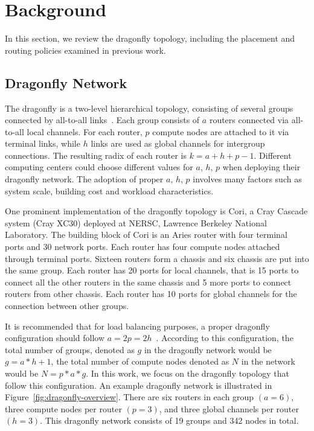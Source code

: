 
\section{Background}
\label{sec:background}

In this section, we review the dragonfly topology, including the placement and routing policies examined in previous work. 

\subsection{Dragonfly Network}
\label{sec:network}
The dragonfly is a two-level hierarchical topology, consisting of several groups connected by all-to-all links~\cite{kim-micro}. Each group consists of $a$ routers connected via all-to-all local channels. For each router, $p$ compute nodes are attached to it via terminal links, while $h$ links are used as global channels for intergroup connections. The resulting radix of each router is $k = a+h+p-1$. Different computing centers could choose different values for  $a$, $h$, $p$ when deploying their dragonfly network. The adoption of proper $a$, $h$, $p$ involves many factors such as system scale, building cost and workload characteristics. 

One prominent implementation of the dragonfly topology is Cori, a Cray Cascade system (Cray XC30)\cite{faanes} deployed at NERSC, Lawrence Berkeley National Laboratory. The building block of Cori is an Aries router with four terminal ports and 30 network ports. Each router has four compute nodes attached through terminal ports. Sixteen routers form a chassis and six chassis are put into the same group. Each router has 20 ports for local channels, that is 15 ports to connect all the other routers in the same chassis and 5 more ports to connect routers from other chassis. Each router has 10 ports for global channels for the connection between other groups. 


It is recommended that for load balancing purposes, a proper dragonfly configuration should follow $a=2p=2h$~\cite{kim-micro}. According to this configuration, the total number of groups, denoted as $g$ in the dragonfly network would be $g = a*h+1 $, the total number of compute nodes denoted as $N$ in the network would be $N = p*a*g $. In this work, we focus on the dragonfly topology that follow this configuration. 
An example dragonfly network is illustrated in Figure~\ref{fig:dragonfly-overview}. There are six routers in each group $(a=6)$, three compute nodes per router $(p=3)$, and three global channels per router $(h=3)$. This dragonfly network consists of 19 groups and 342 nodes in total.

